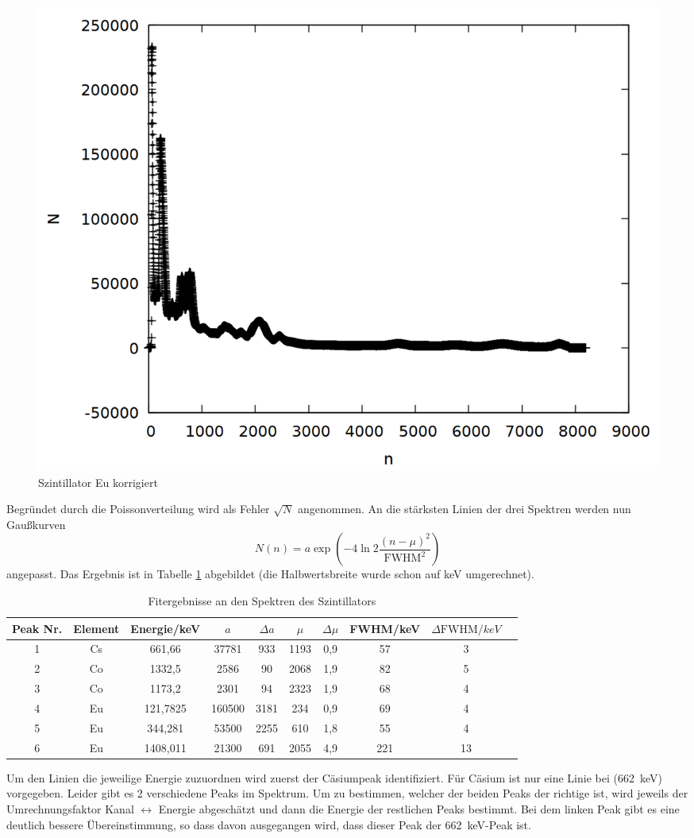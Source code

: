 \begin{figure}[!h]
\centering
\includegraphics[width=0.7\linewidth]{data/si_eu.png}
\caption{Szintillator Eu korrigiert}
\label{fig:si_eu}
\end{figure}

Begründet durch die Poissonverteilung wird als Fehler $\sqrt{N}$ angenommen. An die stärksten Linien der drei Spektren werden nun Gaußkurven \[N(n) = a\exp{\left(-4\ln{2}\frac{(n-\mu)^2}{\text{FWHM}^2}\right)}\] angepasst. Das Ergebnis ist in Tabelle \ref{tab:si} abgebildet (die Halbwertsbreite wurde schon auf keV umgerechnet).

\begin{table}[h]
\caption{Fitergebnisse an den Spektren des Szintillators}
\begin{tabular}{cccccccccc}
\toprule
Peak Nr. & Element & Energie/\si{keV}& $a$ & $\Delta a$ & $\mu$ & $\Delta \mu$ & FWHM/\si{keV} & $\Delta \text{FWHM}/\si{keV}$\\
\midrule 
1	&	Cs	&	661,66	&	37781	&	933	&	1193	&	0,9	&	57	&	3\\
2	&	Co	&	1332,5	&	2586	&	90	&	2068	&	1,9	&	82	&	5\\
3	&	Co	&	1173,2	&	2301	&	94	&	2323	&	1,9	&	68	&	4\\
4	&	Eu	&	121,7825	&	160500	&	3181	&	234	&	0,9	&	69	&	4\\
5	&	Eu	&	344,281	&	53500	&	2255	&	610	&	1,8	&	55	&	4\\
6	&	Eu	&	1408,011	&	21300	&	691	&	2055	&	4,9	&	221	&	13\\
\bottomrule
\end{tabular}
\label{tab:si}
\end{table}

Um den Linien die jeweilige Energie zuzuordnen wird zuerst der Cäsiumpeak identifiziert. Für Cäsium ist nur eine Linie bei (\SI{662}{keV}) vorgegeben. Leider gibt es 2 verschiedene Peaks im Spektrum. Um zu bestimmen, welcher der beiden Peaks der richtige ist, wird jeweils der Umrechnungsfaktor Kanal $\leftrightarrow$ Energie abgeschätzt und dann die Energie der restlichen Peaks bestimmt. Bei dem linken Peak gibt es eine deutlich bessere Übereinstimmung, so dass davon ausgegangen wird, dass dieser Peak der \SI{662}{keV}-Peak ist.\\


